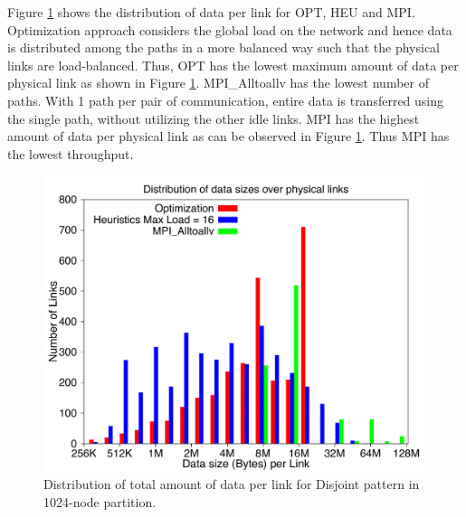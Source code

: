 Figure \ref{fig:loaddata_histo} shows the distribution of data per link for OPT, HEU and MPI. Optimization approach considers the global load on the network and hence data is distributed among the paths in a more balanced way such that the physical links are load-balanced. Thus, OPT has the lowest maximum amount of data per physical link as shown in Figure \ref{fig:loaddata_histo}. MPI\_Alltoallv has the lowest number of paths. With 1 path per pair of communication, entire data is transferred using the single path, without utilizing the other idle links. %
MPI has the highest amount of data per physical link as can be observed in Figure \ref{fig:loaddata_histo}. Thus MPI has the lowest throughput.
\begin{figure}[!htb]
\vspace{-0.1in}
\centering
\includegraphics[scale=0.30]{figures/loaddata_histo.pdf}
\vspace{-0.1in}
\caption{Distribution of total amount of data per link for Disjoint pattern in 1024-node partition.}
\vspace{-0.1in}
\label{fig:loaddata_histo}
\end{figure}



